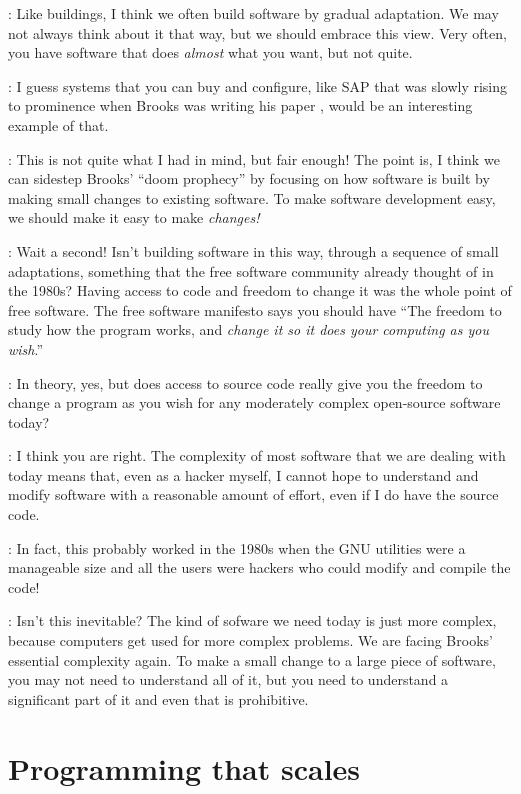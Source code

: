 \documentclass[runningheads]{llncs}
\newcommand{\T}{Tomas}
\newcommand{\J}{Joel}
\newcommand{\says}[2][gg]{\vspace{0.5em}\noindent\hangindent=0.5cm{\textsc{#1}}: #2}
\begin{document}
\says[\J]{Like buildings, I think we often build software by gradual adaptation. We may not always think about it that way, but we should embrace this view. Very often, you have software that does \emph{almost} what you want, but not quite.}

\says[\T]{I guess systems that you can buy and configure, like SAP that was slowly rising to prominence when Brooks was writing his paper \cite{leimbach-2008-sap}, would be an interesting example of that.}

\says[\J]{This is not quite what I had in mind, but fair enough! The point is, I think we can sidestep Brooks' ``doom prophecy'' by focusing on how software is built by making small changes to existing software. To make software development easy, we should make it easy to make \emph{changes!} }

\says[\T]{Wait a second! Isn't building software in this way, through a sequence of small adaptations, something that the free software community already thought of in the 1980s? Having access to code and freedom to change it was the whole point of free software. The free software manifesto says you should have ``The freedom to study how the program works, and \emph{change it so it does your computing as you wish}.''\cite{fsf-2001-whatis}}

\says[\J]{In theory, yes, but does access to source code really give you the freedom to change a program as you wish for any moderately complex open-source software today?}

\says[\T]{I think you are right. The complexity of most software that we are dealing with today means that, even as a hacker myself, I cannot hope to understand and modify software with a reasonable amount of effort, even if I do have the source code.}

\says[\J]{In fact, this probably worked in the 1980s when the GNU utilities were a manageable size and all the users were hackers who could modify and compile the code!}

\says[\T]{Isn't this inevitable? The kind of sofware we need today is just more complex, because computers get used for more complex problems. We are facing Brooks' essential complexity again. To make a small change to a large piece of software, you may not need to understand all of it, but you need to understand a significant part of it and even that is prohibitive. }

\section{Programming that scales}
\end{document}
